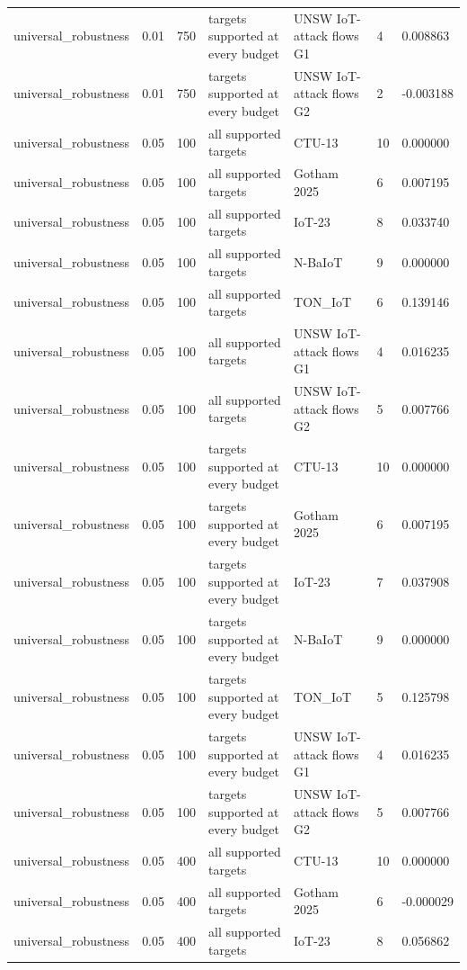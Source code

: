 \begin{tabular}{lllllll}
universal\_robustness & 0.01 & 750 & targets supported at every budget & UNSW IoT-attack flows G1 & 4 & 0.008863 \\
universal\_robustness & 0.01 & 750 & targets supported at every budget & UNSW IoT-attack flows G2 & 2 & -0.003188 \\
universal\_robustness & 0.05 & 100 & all supported targets & CTU-13 & 10 & 0.000000 \\
universal\_robustness & 0.05 & 100 & all supported targets & Gotham 2025 & 6 & 0.007195 \\
universal\_robustness & 0.05 & 100 & all supported targets & IoT-23 & 8 & 0.033740 \\
universal\_robustness & 0.05 & 100 & all supported targets & N-BaIoT & 9 & 0.000000 \\
universal\_robustness & 0.05 & 100 & all supported targets & TON\_IoT & 6 & 0.139146 \\
universal\_robustness & 0.05 & 100 & all supported targets & UNSW IoT-attack flows G1 & 4 & 0.016235 \\
universal\_robustness & 0.05 & 100 & all supported targets & UNSW IoT-attack flows G2 & 5 & 0.007766 \\
universal\_robustness & 0.05 & 100 & targets supported at every budget & CTU-13 & 10 & 0.000000 \\
universal\_robustness & 0.05 & 100 & targets supported at every budget & Gotham 2025 & 6 & 0.007195 \\
universal\_robustness & 0.05 & 100 & targets supported at every budget & IoT-23 & 7 & 0.037908 \\
universal\_robustness & 0.05 & 100 & targets supported at every budget & N-BaIoT & 9 & 0.000000 \\
universal\_robustness & 0.05 & 100 & targets supported at every budget & TON\_IoT & 5 & 0.125798 \\
universal\_robustness & 0.05 & 100 & targets supported at every budget & UNSW IoT-attack flows G1 & 4 & 0.016235 \\
universal\_robustness & 0.05 & 100 & targets supported at every budget & UNSW IoT-attack flows G2 & 5 & 0.007766 \\
universal\_robustness & 0.05 & 400 & all supported targets & CTU-13 & 10 & 0.000000 \\
universal\_robustness & 0.05 & 400 & all supported targets & Gotham 2025 & 6 & -0.000029 \\
universal\_robustness & 0.05 & 400 & all supported targets & IoT-23 & 8 & 0.056862 \\

\end{tabular}
